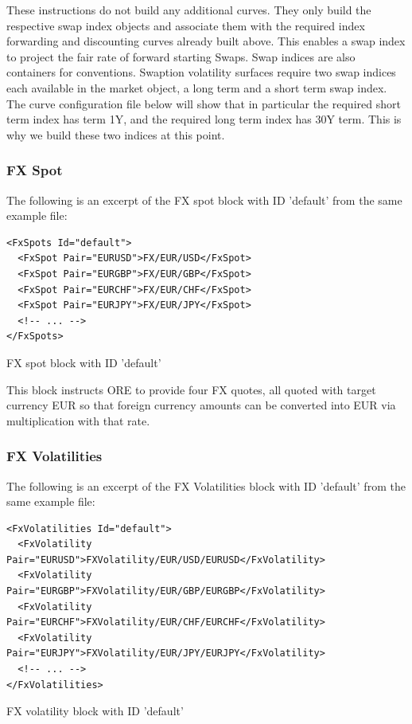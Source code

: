\documentclass[12pt, a4paper]{article}
\begin{document}
{These instructions do not build any additional curves. They only build the respective swap index objects and associate
them with the required index forwarding and discounting curves already built above. This enables a swap index to project
the fair rate of forward starting Swaps. Swap indices are also containers for conventions. Swaption volatility surfaces
require two swap indices each available in the market object, a long term and a short term swap index. The curve
configuration file below will show that in particular the required short term index has term 1Y, and the required long
term index has 30Y term. This is why we build these two indices at this point.

\subsubsection{FX Spot}

The following is an excerpt of the FX spot block with ID 'default' from the same example file:

\begin{listing}[H]
\begin{verbatim}
<FxSpots Id="default">
  <FxSpot Pair="EURUSD">FX/EUR/USD</FxSpot>
  <FxSpot Pair="EURGBP">FX/EUR/GBP</FxSpot>
  <FxSpot Pair="EURCHF">FX/EUR/CHF</FxSpot>
  <FxSpot Pair="EURJPY">FX/EUR/JPY</FxSpot>
  <!-- ... -->
</FxSpots>
\end{verbatim}
\caption{FX spot block with ID 'default'}
\label{lst:fxspot_spec}
\end{listing}

This block instructs ORE to provide four FX quotes, all quoted with target currency EUR so
that foreign currency amounts can be converted into EUR via multiplication with that rate.
 
\subsubsection{FX Volatilities}

The following is an excerpt of the FX Volatilities block with ID 'default' from the same example file:

\begin{listing}[H]
\begin{verbatim}
<FxVolatilities Id="default">
  <FxVolatility Pair="EURUSD">FXVolatility/EUR/USD/EURUSD</FxVolatility>
  <FxVolatility Pair="EURGBP">FXVolatility/EUR/GBP/EURGBP</FxVolatility>
  <FxVolatility Pair="EURCHF">FXVolatility/EUR/CHF/EURCHF</FxVolatility>
  <FxVolatility Pair="EURJPY">FXVolatility/EUR/JPY/EURJPY</FxVolatility>
  <!-- ... -->
</FxVolatilities>
\end{verbatim}
\caption{FX volatility block with ID 'default'}
\label{lst:fxvol_spec}
\end{listing}

}
\end{document}
